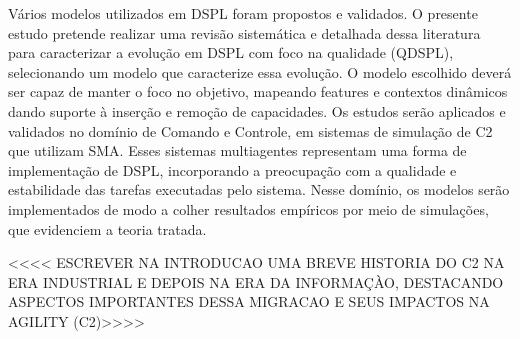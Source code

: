 Vários modelos utilizados em DSPL foram propostos e validados. O presente estudo pretende realizar uma revisão sistemática e detalhada dessa literatura para caracterizar a evolução em DSPL com foco na qualidade (QDSPL), selecionando um modelo que caracterize essa evolução. O modelo escolhido deverá ser capaz de manter o foco no objetivo, mapeando features e contextos dinâmicos dando suporte à inserção e remoção de capacidades.
Os estudos serão aplicados e validados no domínio de Comando e Controle, em sistemas de simulação de C2 que utilizam SMA. Esses sistemas multiagentes representam uma forma de implementação de DSPL, incorporando a preocupação com a qualidade e estabilidade das tarefas executadas pelo sistema.
Nesse domínio, os modelos serão implementados de modo a colher resultados empíricos por meio de simulações, que evidenciem a teoria tratada.


<<<< ESCREVER NA INTRODUCAO UMA BREVE HISTORIA DO C2 NA ERA INDUSTRIAL E DEPOIS NA ERA DA INFORMAÇÀO, DESTACANDO ASPECTOS IMPORTANTES DESSA MIGRACAO E SEUS IMPACTOS NA AGILITY (C2)>>>>






